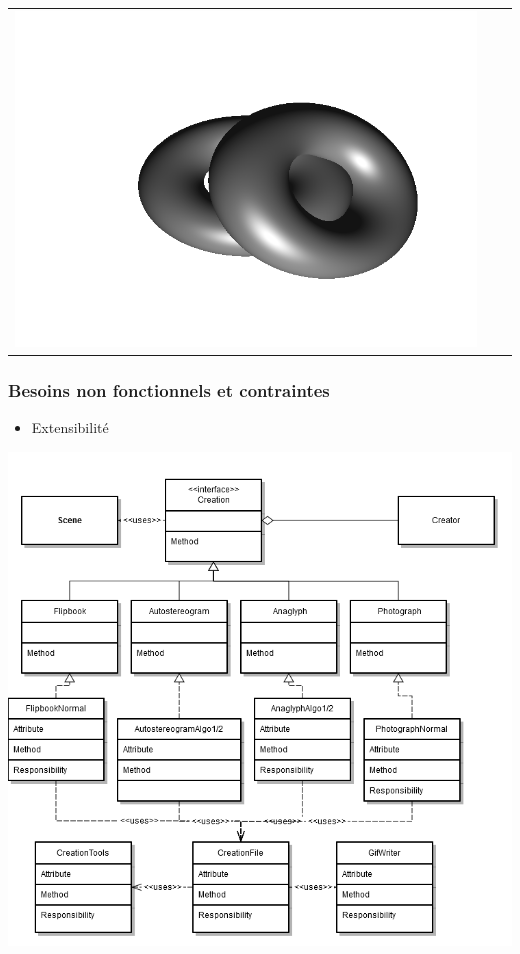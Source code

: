 \documentclass{beamer}
\begin{document}
\begin{frame}
\begin{tabular}{l|c|r}
\includegraphics[scale=0.15]{flip3.png}
\end{tabular}
\end{frame}

%
\begin{frame}
\frametitle{Besoins non fonctionnels et contraintes}
\begin{itemize}[label=$\bullet$]
\item Extensibilité
\end{itemize}
\centering
\includegraphics[scale=0.25]{extensibilite.png}
\end{frame}
\end{document}

